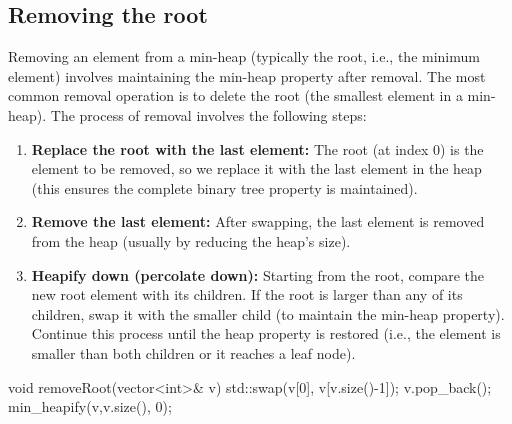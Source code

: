 \documentclass{report}
\begin{document}
\subsection{Removing the root}
\bigbreak \noindent 
Removing an element from a min-heap (typically the root, i.e., the minimum element) involves maintaining the min-heap property after removal. The most common removal operation is to delete the root (the smallest element in a min-heap). The process of removal involves the following steps:
\bigbreak \noindent 
\begin{enumerate}
    \item \textbf{Replace the root with the last element:} The root (at index 0) is the element to be removed, so we replace it with the last element in the heap (this ensures the complete binary tree property is maintained). 
    \item \textbf{Remove the last element:} After swapping, the last element is removed from the heap (usually by reducing the heap's size).
    \item \textbf{Heapify down (percolate down):} Starting from the root, compare the new root element with its children.
        \bigbreak \noindent 
        If the root is larger than any of its children, swap it with the smaller child (to maintain the min-heap property).
        \bigbreak \noindent 
        Continue this process until the heap property is restored (i.e., the element is smaller than both children or it reaches a leaf node).
\end{enumerate}

\bigbreak \noindent 
\begin{cppcode}
    void removeRoot(vector<int>& v) {
        std::swap(v[0], v[v.size()-1]);
        v.pop_back();
        min_heapify(v,v.size(), 0);
    }
\end{cppcode}

\pagebreak 
\end{document}
